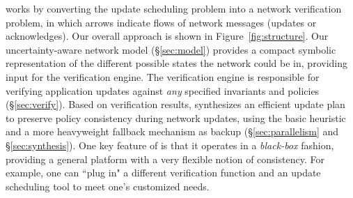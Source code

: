 \name works by converting the update scheduling problem into a network verification problem, in which arrows indicate flows of network messages (updates or acknowledges).  
Our overall approach is shown in Figure~\ref{fig:structure}.
Our uncertainty-aware network model (\S\ref{sec:model}) provides a compact symbolic
representation of the different possible states the network could be in,
providing input for the verification engine.
The verification engine is responsible for verifying 
application updates against {\em any} specified
invariants and policies (\S\ref{sec:verify}). 
Based on verification results, \name synthesizes an
efficient update plan to preserve policy consistency during network updates,
using the basic heuristic and a more heavyweight fallback mechanism as backup 
(\S\ref{sec:parallelism} and \S\ref{sec:synthesis}).  
One key feature of \name is that it operates in a {\em black-box} fashion, providing
a general platform with a very flexible notion of consistency.
For example, one can 
``plug in" a different verification
function and an update scheduling tool to meet one's customized needs.

